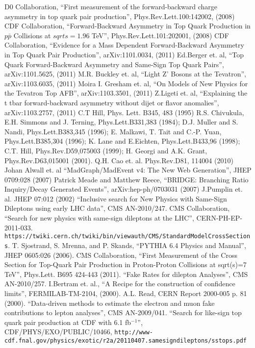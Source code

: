 \begin{thebibliography}{99}

 {D0 Collaboration, ``First measurement of the forward-backward charge asymmetry in top quark pair production'', Phys.Rev.Lett.100:142002, (2008)}
 {CDF Collaboration, ``Forward-Backward Asymmetry in Top Quark Production in $p\bar{p}$ Collisions at $sqrt{s}=1.96$ TeV'', Phys.Rev.Lett.101:202001, (2008)}
 {CDF Collaboration, ``Evidence for a Mass Dependent Forward-Backward Asymmetry in Top Quark Pair Production'', arXiv:1101.0034, (2011)}
 {Ed.Berger et. al, ``Top Quark Forward-Backward Asymmetry and Same-Sign Top Quark Pairs'', arXiv:1101.5625, (2011)}
 {M.R. Buckley et. al, ``Light Z' Bosons at the Tevatron'', arXiv:1103.6035, (2011)}
 {Moira I. Gresham et. al, ``On Models of New Physics for the Tevatron Top AFB'', arXiv:1103.3501, (2011)}
 {Z.Ligeti et. al, ``Explaining the t tbar forward-backward asymmetry without dijet or flavor anomalies'', arXiv:1103.2757, (2011)}
 {C.T Hill, Phys. Lett. B345, 483 (1995)}
 {R.S. Chivukula, E.H. Simmons and J. Terning, Phys.Lett.B331,383 (1984); D.J. Muller and S. Nandi, Phys.Lett.B383,345 (1996); E. Malkawi, T. Tait 
and C.-P. Yuan, Phys.Lett.B385,304 (1996); K. Lane and E.Eichten, Phys.Lett.B433,96 (1998); C.T. Hill, Phys.Rev.D59,075003 (1999); H. Georgi and A.K. Grant, 
Phys.Rev.D63,015001 (2001).}
 {Q.H. Cao et. al. Phys.Rev.D81, 114004 (2010)}
 {Johan Alwall et. al ``MadGraph/MadEvent v4: The New Web Generation'', JHEP 0709:028 (2007)}
 {Patrick Meade and Matthew Reece, ``BRIDGE: Branching Ratio Inquiry/Decay Generated Events'', 	arXiv:hep-ph/0703031 (2007)}
 {J.Pumplin et. al. JHEP 07:012 (2002)}
 {``Inclusive search for New Physics with Same-Sign Dileptons using early LHC data''}, CMS AN-2010/247.
 {CMS Collaboration, ``Search for new physics with same-sign dileptons at the LHC''}, CERN-PH-EP-2011-033.
 {\tt https://twiki.cern.ch/twiki/bin/viewauth/CMS/StandardModelCrossSections}.
 {T. Sjostrand, S. Mrenna, and P. Skands, ``PYTHIA 6.4 Physics and Manual'', JHEP 0605:026 (2006)}.
 {CMS Collaboration, ``First Measurement of the Cross Section for Top-Quark Pair Production in Proton-Proton Collisions at 
sqrt(s)=7 TeV'', Phys.Lett. B695 424-443 (2011)}.
 {``Fake Rates for dilepton Analyses''}, CMS AN-2010/257.
 {I.Bertram et. al., ``A Recipe for the construction of confidence limits'', FERMILAB-TM-2104, (2000).}
 {A.L. Read, CERN Report 2000-005 p. 81 (2000).}
 {``Data-driven methods to estimate the electron and muon fake contributions to lepton analyses''}, CMS AN-2009/041.
 {``Search for like-sign top quark pair production at CDF with 6.1 fb$^{-1}$''}, CDF/PHYS/EXO/PUBLIC/10466, 
{\tt http://www-cdf.fnal.gov/physics/exotic/r2a/20110407.samesigndileptons/sstops.pdf}

\end{thebibliography}
